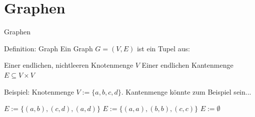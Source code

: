 \def\tutdate{12.01.2017}


\section{Graphen}
\begin{frame}{Graphen}
	\begin{block}{Definition: Graph}
		\ip Ein Graph $G = (V,E)$ ist ein Tupel aus:
		\begin{itemize}
			\pitem Einer endlichen, nichtleeren Knotenmenge $V$
			\pitem Einer endlichen Kantenmenge $E \subseteq V \times V$
		\end{itemize}
	\end{block}
	
	\bp
	
	Beispiel: Knotenmenge $V := \{a, b, c, d\}$. Kantenmenge könnte zum Beispiel sein...
	
	\begin{itemize}
		\pitem $E := \{(a,b), (c, d), (a, d)\}$
		\pitem $E := \{(a,a), (b,b), (c,c)\}$
		\pitem $E := \emptyset$
	\end{itemize}
\end{frame}

